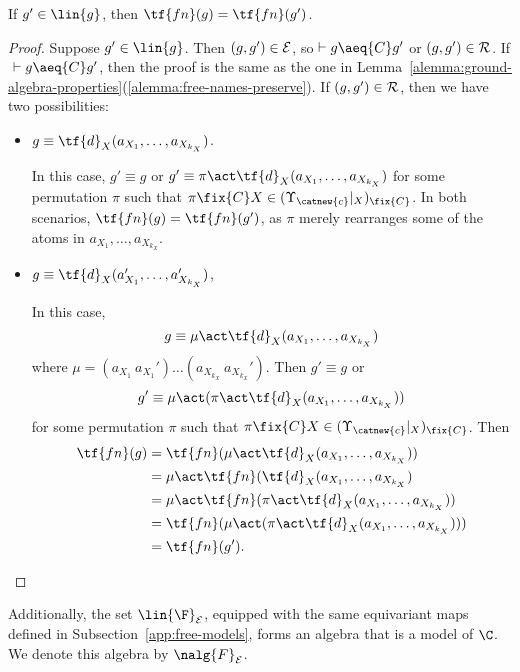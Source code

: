 \begin{lemma}
    If $g'\in \lin{g}$, then $\tf{fn}(g) = \tf{fn}(g')$.
\end{lemma}

\begin{proof}
    Suppose  $g'\in \lin{g}$. Then $(g,g')\in{\cal E}$, so$~\vdash g\aeq{C} g'$ or $(g,g')\in {\cal R}$. If$~\vdash g\aeq{C} g'$, then the proof is the same as the one in Lemma~\ref{alemma:ground-algebra-properties}(\ref{alemma:free-names-preserve}). If $(g,g')\in {\cal R}$, then we have two possibilities:

    \begin{itemize}
        \item $g \equiv  \tf{d}_X(a_{X_1},\ldots,a_{X_{k_X}})$.

        In this case, $g' \equiv g$ or $g' \equiv \pi \act \tf{d}_X(a_{X_1}, \ldots, a_{X_{k_X}})$ for some permutation $\pi$ such that $\pi\fix{C} X \in (\Upsilon_{\catnew{c}}|_X)_{\fix{C}}$. In both scenarios, $\tf{fn}(g) = \tf{fn}(g')$, as $\pi$ merely rearranges some of the atoms in $a_{X_1}, \ldots, a_{X_{k_X}}$.

        \item  $g \equiv \tf{d}_X(a_{X_1}',\ldots,a_{X_{k_X}}')$,

        In this case,
        \[
            g \equiv \mu\act \tf{d}_X(a_{X_1},\ldots,a_{X_{k_X}})
        \]
        where $\mu = (a_{X_1} \ a_{X_1}')\ldots(a_{X_{k_X}} \ a_{X_{k_X}}')$. Then $g' \equiv g$ or 
        \[
            g'\equiv \mu\act(\pi\act \tf{d}_X(a_{X_1},\ldots,a_{X_{k_X}}))
        \]
        for some permutation $\pi$ such that $\pi\fix{C} X \in (\Upsilon_{\catnew{c}}|_X)_{\fix{C}}$. Then
        \begin{align*}
            \tf{fn}(g) &= \tf{fn}(\mu\act \tf{d}_X(a_{X_1},\ldots,a_{X_{k_X}}))\\
            &= \mu\act\tf{fn}( \tf{d}_X(a_{X_1},\ldots,a_{X_{k_X}})\\
            &= \mu\act\tf{fn}(\pi\act \tf{d}_X(a_{X_1},\ldots,a_{X_{k_X}}))\\
            &= \tf{fn}(\mu\act(\pi\act \tf{d}_X(a_{X_1},\ldots,a_{X_{k_X}})))\\
            &= \tf{fn}(g').
        \end{align*}
    \end{itemize}
\end{proof}


Additionally, the set $\lin{\F}_{\cal E}$, equipped with the same equivariant maps defined in Subsection~\ref{app:free-models}, forms an algebra that is a model of $\C$. We denote this algebra by $\nalg{F}_{\cal E}$.

